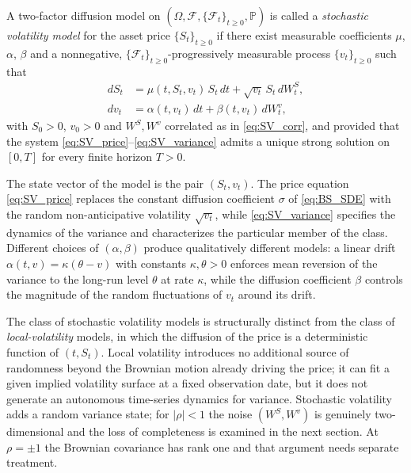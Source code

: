 \begin{definition}
A two-factor diffusion model on
$(\Omega,\mathcal{F},\{\mathcal{F}_t\}_{t\geq 0},\mathbb{P})$ is called a
\emph{stochastic volatility model} for the asset price
$\{S_t\}_{t\geq 0}$ if there exist measurable coefficients $\mu$,
$\alpha$, $\beta$ and a nonnegative,
$\{\mathcal{F}_t\}_{t\geq 0}$-progressively measurable process
$\{v_t\}_{t\geq 0}$ such that
\begin{align}
dS_t &= \mu(t,S_t,v_t)\,S_t\,dt
       + \sqrt{v_t}\,S_t\,dW^{S}_t, \label{eq:SV_price}
       \\
dv_t &= \alpha(t,v_t)\,dt
       + \beta(t,v_t)\,dW^{v}_t, \label{eq:SV_variance}
\end{align}
with $S_0>0$, $v_0>0$ and $W^{S}, W^{v}$ correlated as in
\eqref{eq:SV_corr}, and provided that the system
\eqref{eq:SV_price}--\eqref{eq:SV_variance} admits a unique strong
solution on $[0,T]$ for every finite horizon $T>0$.
\end{definition}

The state vector of the model is the pair $(S_t,v_t)$. The price equation
\eqref{eq:SV_price} replaces the constant diffusion coefficient $\sigma$
of \eqref{eq:BS_SDE} with the random non-anticipative volatility
$\sqrt{v_t}$, while \eqref{eq:SV_variance} specifies the dynamics of the
variance and characterizes the particular member of the class. Different
choices of $(\alpha,\beta)$ produce qualitatively different models: a
linear drift $\alpha(t,v) = \kappa(\theta-v)$ with constants
$\kappa,\theta>0$ enforces mean reversion of the variance to the long-run
level $\theta$ at rate $\kappa$, while the diffusion coefficient $\beta$
controls the magnitude of the random fluctuations of $v_t$ around its
drift.

\begin{remark}
The class of stochastic volatility models is structurally distinct from
the class of \emph{local-volatility} models, in which the diffusion of
the price is a deterministic function of $(t,S_t)$. Local volatility
introduces no additional source of randomness beyond the Brownian motion
already driving the price; it can fit a given implied volatility surface
at a fixed observation date, but it does not generate an autonomous
time-series dynamics for variance. Stochastic volatility adds a random variance state; for $|\rho|<1$ the noise $(W^{S},W^{v})$ is genuinely two-dimensional and the loss of completeness is examined in the next section. At $\rho=\pm1$ the Brownian covariance has rank one and that argument needs separate treatment.
\end{remark}
